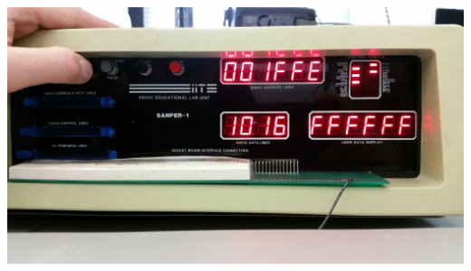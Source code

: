 \documentclass[12pt, twocolumn]{article}
\begin{document}
\begin{center}
\includegraphics[width=1\linewidth]{Lab1/20150120_093621}
\end{center}
\end{document}
